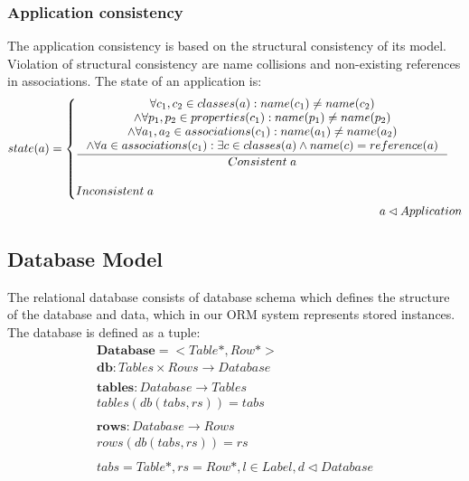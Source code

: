 \documentclass[11pt]{article}
\begin{document}
\subsubsection{Application consistency}
The application consistency is based on the structural consistency of its model. Violation of structural consistency are name collisions and non-existing references in associations. The state of an application is:
\begin{align*}
	state(a) = \begin{cases}
	\inference{\forall c_1, c_2 \in classes(a) : name(c_1) \neq name(c_2) \\ \wedge \forall p_1, p_2 \in properties(c_1) : name(p_1) \neq name(p_2) \\ \wedge \forall a_1, a_2 \in associations(c_1) : name(a_1) \neq name (a_2) \\ \wedge \forall a \in associations(c_1) : \exists c \in classes(a) \wedge name(c) = reference(a) }{Consistent \; a}\\\\
 	Inconsistent \; a
 	\end{cases}\\
	a \lhd Application
\end{align*}


\subsection{Database Model}
\label{sec:dbModel}
The relational database consists of database schema which defines the structure of the database and data, which in our ORM system represents stored instances. The database is defined as a tuple:
\begin{align*}
	\mathbf{Database} = < Table*, Row*> \\
	\mathbf{db} : Tables \times Rows \rightarrow Database \\ \\
	\mathbf{tables} : Database \rightarrow Tables \\
	tables(db(tabs, rs)) = tabs \\ \\
	\mathbf{rows} : Database \rightarrow Rows \\
	rows(db(tabs, rs)) = rs \\ \\
	tabs = Table*, rs = Row*, l \in Label,d \lhd Database
\end{align*}
\end{document}
